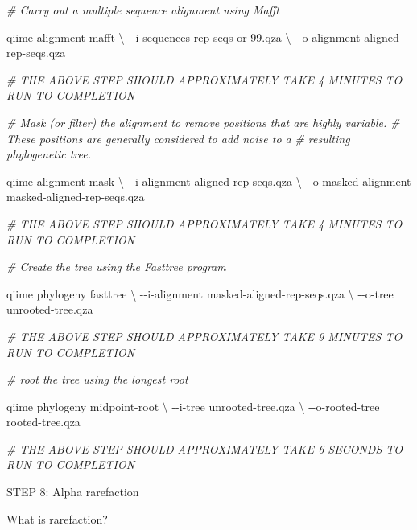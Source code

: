 \documentclass[
]{book}
\newenvironment{Shaded}{\begin{snugshade}}{\end{snugshade}}
\newcommand{\CommentTok}[1]{\textcolor[rgb]{0.56,0.35,0.01}{\textit{#1}}}
\newcommand{\DataTypeTok}[1]{\textcolor[rgb]{0.13,0.29,0.53}{#1}}
\newcommand{\ExtensionTok}[1]{#1}
\newcommand{\NormalTok}[1]{#1}
\begin{document}
\begin{Shaded}
\begin{Highlighting}[]

\CommentTok{\# Carry out a multiple sequence alignment using Mafft}

\ExtensionTok{qiime}\NormalTok{ alignment mafft }\DataTypeTok{\textbackslash{}}
\NormalTok{{-}{-}i{-}sequences rep{-}seqs{-}or{-}99.qza }\DataTypeTok{\textbackslash{}}
\NormalTok{{-}{-}o{-}alignment aligned{-}rep{-}seqs.qza}

\CommentTok{\# THE ABOVE STEP SHOULD APPROXIMATELY TAKE 4 MINUTES TO RUN TO COMPLETION}

\CommentTok{\# Mask (or filter) the alignment to remove positions that are highly variable. }
\CommentTok{\# These positions are generally considered to add noise to a}
\CommentTok{\# resulting phylogenetic tree.}

\ExtensionTok{qiime}\NormalTok{ alignment mask }\DataTypeTok{\textbackslash{}}
\NormalTok{{-}{-}i{-}alignment aligned{-}rep{-}seqs.qza }\DataTypeTok{\textbackslash{}}
\NormalTok{{-}{-}o{-}masked{-}alignment masked{-}aligned{-}rep{-}seqs.qza}

\CommentTok{\# THE ABOVE STEP SHOULD APPROXIMATELY TAKE 4 MINUTES TO RUN TO COMPLETION}

\CommentTok{\# Create the tree using the Fasttree program}

\ExtensionTok{qiime}\NormalTok{ phylogeny fasttree }\DataTypeTok{\textbackslash{}}
\NormalTok{{-}{-}i{-}alignment masked{-}aligned{-}rep{-}seqs.qza }\DataTypeTok{\textbackslash{}}
\NormalTok{{-}{-}o{-}tree unrooted{-}tree.qza}

\CommentTok{\# THE ABOVE STEP SHOULD APPROXIMATELY TAKE 9 MINUTES TO RUN TO COMPLETION}

\CommentTok{\# root the tree using the longest root}

\ExtensionTok{qiime}\NormalTok{ phylogeny midpoint{-}root }\DataTypeTok{\textbackslash{}}
\NormalTok{{-}{-}i{-}tree unrooted{-}tree.qza }\DataTypeTok{\textbackslash{}}
\NormalTok{{-}{-}o{-}rooted{-}tree rooted{-}tree.qza}

\CommentTok{\# THE ABOVE STEP SHOULD APPROXIMATELY TAKE 6 SECONDS TO RUN TO COMPLETION}
\end{Highlighting}
\end{Shaded}

STEP 8: Alpha rarefaction

What is rarefaction?
\end{document}
